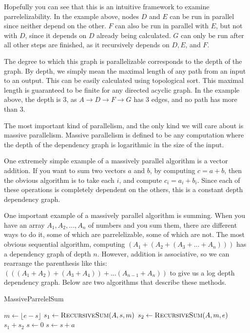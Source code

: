 \documentclass[12pt,twoside]{reedthesis}
\newcommand{\floor}[1]{\lfloor #1 \rfloor}
\begin{document}
		Hopefully you can see that this is an intuitive framework to examine parrelelizability. In the example above, nodes $D$ and $E$ can be run in parallel since neither depend on the other. $F$ can also be run in parallel with $E$, but not with $D$, since it depends on $D$ already being calculated. $G$ can only be run after all other steps are finished, as it recursively depends on $D,E$, and $F$.

		The degree to which this graph is parallelizable corresponds to the depth of the graph. By depth, we simply mean the maximal length of any path from an input to an output. This can be easily calculated using topological sort. This maximal length is guaranteed to be finite for any directed acyclic graph. In the example above, the depth is 3, as $A\rightarrow D \rightarrow F \rightarrow G$ has 3 edges, and no path has more than 3.

		The most important kind of parallelism, and the only kind we will care about is massive parallelism. Massive parallelism is defined to be any computation where the depth of the dependency graph is logarithmic in the size of the input.

		One extremely simple example of a massively parallel algorithm is a vector addition. If you want to sum two vectors $a$ and $b$, by computing $c = a+b$, then the obvious algorithm is to take each $i$, and compute $c_i = a_i + b_i$. Since each of these operations is completely dependent on the others, this is a constant depth dependency graph.

		One important example of a massively parallel algorithm is summing. When you have an array $A_1,A_2,...,A_n$ of numbers and you sum them, there are different ways to do it, some of which are parrelelizable, some of which are not. The most obvious sequential algorithm, computing $(A_1+(A_2+(A_3+...+A_n)))$ has a dependency graph of depth $n$. However, addition is associative, so we can rearrange the parenthesis like this: $(((A_1+A_2)+(A_3+A_4))+...(A_{n-1}+A_n))$ to give us a log depth dependency graph. Below are two algorithms that describe these methods.

		\begin{algorithm}
			\caption{MassiveParrelelSum}\label{parellelsum}
			\begin{algorithmic}[1]
					\EndIf
					\State $m \gets \floor{e-s}$
					\State $s_1 \gets \textsc{RecursiveSum}(A,s,m)$
					\State $s_2 \gets \textsc{RecursiveSum}(A,m,e)$
					\State \Return $s_1+s_2$
				\EndFunction
					\State $s \gets 0$
						\State $s \gets s + a$
					\EndFor
				\EndFunction
			\end{algorithmic}
		\end{algorithm}
\end{document}
